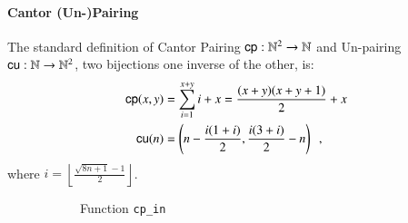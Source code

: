 \documentclass[preprint]{elsarticle}
\theoremstyle{remark}
\begin{document}
\paragraph{Cantor (Un-)Pairing}
The standard definition of Cantor Pairing $\mathsf{cp} : \mathbb{N}^2 \to \mathbb{N}$ and Un-pairing $\mathsf{cu} : \mathbb{N} \to \mathbb{N}^2$, two bijections one inverse of the other, is:
\begin{align}
\label{align: cp analitically}
\mathsf{cp}(x,y) & = \sum_{i=1}^{x+y}i + x = \frac{(x + y)(x + y + 1)}{2} + x
\\
\label{align: cu analitically}
\mathsf{cu}(n)  & = \left( n - \frac{i(1+i)}{2}, \frac{i(3+i)}{2} - n \right)
\enspace ,
\end{align}
where $i = \left\lfloor \frac{\sqrt{8n + 1} - 1}{2} \right\rfloor $.

\begin{figure}
\begin{subfigure}{.975\textwidth}
    \centering
{}
    \caption{Function \lstinline|cp_in|}
    \label{sfig:cp input}
\end{subfigure}
\\ \\ \\
\begin{subfigure}{.975\textwidth}
\centering
\scalebox{.55}{
}
\end{subfigure}
\end{figure}
\end{document}

